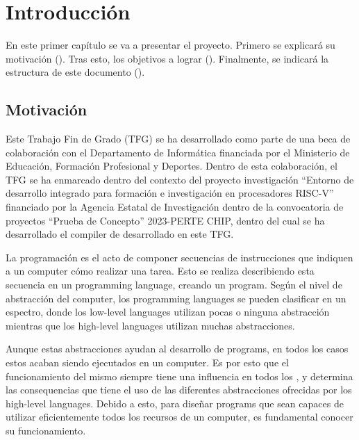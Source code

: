 \chapter{Introducción}\label{chap:introduction}

En este primer capítulo se va a presentar el proyecto. Primero se explicará su
motivación (). Tras esto, los objetivos a
lograr (). Finalmente, se indicará la estructura de este
documento ().

\section{Motivación}\label{sec:motivation}

Este Trabajo Fin de Grado (TFG) se ha desarrollado como parte de una beca de
colaboración con el Departamento de Informática financiada por el Ministerio de
Educación, Formación Profesional y Deportes. Dentro de esta colaboración, el TFG
se ha enmarcado dentro del contexto del proyecto investigación ``Entorno de
desarrollo integrado para formación e investigación en procesadores RISC-V''
financiado por la Agencia Estatal de Investigación dentro de la convocatoria de
proyectos ``Prueba de Concepto'' 2023-PERTE CHIP, dentro del cual se ha
desarrollado el \gls{compiler} de  desarrollado
en este TFG.

La programación es el acto de componer secuencias de instrucciones que indiquen
a un \gls{computer} cómo realizar una tarea. Esto se realiza describiendo esta
secuencia en un \gls{programming language}, creando un \gls{program}. Según el
nivel de abstracción del \gls{computer}, los \glspl{programming language} se
pueden clasificar en un espectro, donde los \glspl{low-level language} utilizan
pocas o ninguna abstracción mientras que los \glspl{high-level language}
utilizan muchas abstracciones.

Aunque estas abstracciones ayudan al desarrollo de \glspl{program}, en todos los
casos estos acaban siendo ejecutados en un \gls{computer}. Es por esto que el
funcionamiento del mismo siempre tiene una influencia en todos los
, y determina las consequencias que
tiene el uso de las diferentes abstracciones ofrecidas por los \glspl{high-level
language}. Debido a esto, para diseñar \glspl{program} que sean capaces de
utilizar eficientemente todos los recursos de un \gls{computer}, es fundamental
conocer su funcionamiento.

